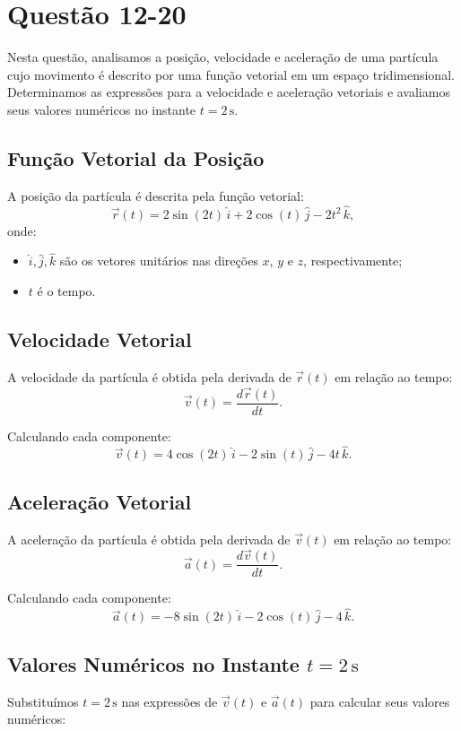 \section{Questão 12-20}

Nesta questão, analisamos a posição, velocidade e aceleração de uma partícula cujo movimento é descrito por uma função vetorial em um espaço tridimensional. Determinamos as expressões para a velocidade e aceleração vetoriais e avaliamos seus valores numéricos no instante \(t = 2 \, \text{s}\).

\subsection*{Função Vetorial da Posição}
A posição da partícula é descrita pela função vetorial:
\[
\vec{r}(t) = 2 \sin(2t) \, \hat{i} + 2 \cos(t) \, \hat{j} - 2t^2 \, \hat{k},
\]
onde:
\begin{itemize}
    \item \(\hat{i}, \hat{j}, \hat{k}\) são os vetores unitários nas direções \(x\), \(y\) e \(z\), respectivamente;
    \item \(t\) é o tempo.
\end{itemize}

\subsection*{Velocidade Vetorial}
A velocidade da partícula é obtida pela derivada de \(\vec{r}(t)\) em relação ao tempo:
\[
\vec{v}(t) = \frac{d\vec{r}(t)}{dt}.
\]

Calculando cada componente:
\[
\vec{v}(t) = 4 \cos(2t) \, \hat{i} - 2 \sin(t) \, \hat{j} - 4t \, \hat{k}.
\]

\subsection*{Aceleração Vetorial}
A aceleração da partícula é obtida pela derivada de \(\vec{v}(t)\) em relação ao tempo:
\[
\vec{a}(t) = \frac{d\vec{v}(t)}{dt}.
\]

Calculando cada componente:
\[
\vec{a}(t) = -8 \sin(2t) \, \hat{i} - 2 \cos(t) \, \hat{j} - 4 \, \hat{k}.
\]

\subsection*{Valores Numéricos no Instante \(t = 2 \, \text{s}\)}
Substituímos \(t = 2 \, \text{s}\) nas expressões de \(\vec{v}(t)\) e \(\vec{a}(t)\) para calcular seus valores numéricos:

